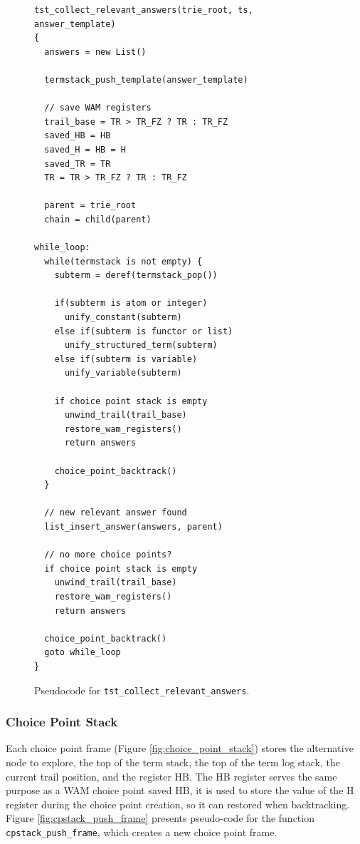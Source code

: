 \begin{figure}[ht]
\begin{Verbatim}[fontsize=\small]
tst_collect_relevant_answers(trie_root, ts, answer_template)
{
  answers = new List()
  
  termstack_push_template(answer_template)
  
  // save WAM registers
  trail_base = TR > TR_FZ ? TR : TR_FZ
  saved_HB = HB
  saved_H = HB = H
  saved_TR = TR
  TR = TR > TR_FZ ? TR : TR_FZ
  
  parent = trie_root
  chain = child(parent)
  
while_loop:
  while(termstack is not empty) {
    subterm = deref(termstack_pop())
    
    if(subterm is atom or integer)
      unify_constant(subterm)
    else if(subterm is functor or list)
      unify_structured_term(subterm)
    else if(subterm is variable)
      unify_variable(subterm)
      
    if choice point stack is empty
      unwind_trail(trail_base)
      restore_wam_registers()
      return answers
    
    choice_point_backtrack()
  }
  
  // new relevant answer found
  list_insert_answer(answers, parent)
  
  // no more choice points?
  if choice point stack is empty
    unwind_trail(trail_base)
    restore_wam_registers()
    return answers
    
  choice_point_backtrack()
  goto while_loop
}
\end{Verbatim}
\caption{Pseudo\-code for \texttt{tst\_collect\_relevant\_answers}.}
\label{fig:tst_collect_relevant_answers}
\end{figure}

\subsubsection{Choice Point Stack}

Each choice point frame (Figure \ref{fig:choice_point_stack}) stores the alternative node to explore, the top of the term stack, the top of the term log stack, the current trail position, and the register HB. The HB register serves the same purpose as a WAM choice point saved HB, it is used to store the value of the H register during the choice point creation, so it can restored when backtracking. Figure \ref{fig:cpstack_push_frame} presents pseudo-code for the function \texttt{cpstack\_push\_frame}, which creates a new choice point frame.

